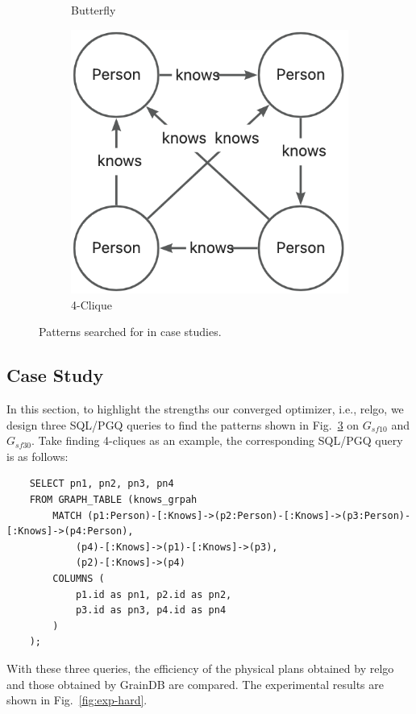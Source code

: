 \begin{figure}
\begin{subfigure}[b]{.3\linewidth}
        \caption{Butterfly}
        \label{fig:exp-hard-butterfly}
    \end{subfigure}
    \begin{subfigure}[b]{0.3\linewidth}
        \centering
        \includegraphics[width=\linewidth]{./figures/exp/pattern-clique.png}
        \caption{4-Clique}
        \label{fig:exp-hard-clique}
    \end{subfigure}
    \caption{Patterns searched for in case studies.}
    \label{fig:exp-hard-patterns}
\end{figure}

\subsection{Case Study}
\label{sec:experiment-case-study}

In this section, to highlight the strengths our converged optimizer, i.e., relgo, we design three SQL/PGQ queries to find the patterns shown in Fig.~\ref{fig:exp-hard-patterns} on $G_{sf10}$ and $G_{sf30}$.
Take finding 4-cliques as an example, the corresponding SQL/PGQ query is as follows:
\begin{lstlisting}
    SELECT pn1, pn2, pn3, pn4 
    FROM GRAPH_TABLE (knows_grpah
        MATCH (p1:Person)-[:Knows]->(p2:Person)-[:Knows]->(p3:Person)-[:Knows]->(p4:Person),
            (p4)-[:Knows]->(p1)-[:Knows]->(p3),
            (p2)-[:Knows]->(p4)
        COLUMNS (
            p1.id as pn1, p2.id as pn2, 
            p3.id as pn3, p4.id as pn4
        )
    );
\end{lstlisting}
With these three queries, the efficiency of the physical plans obtained by relgo and those obtained by GrainDB are compared.
The experimental results are shown in Fig.~\ref{fig:exp-hard}.


